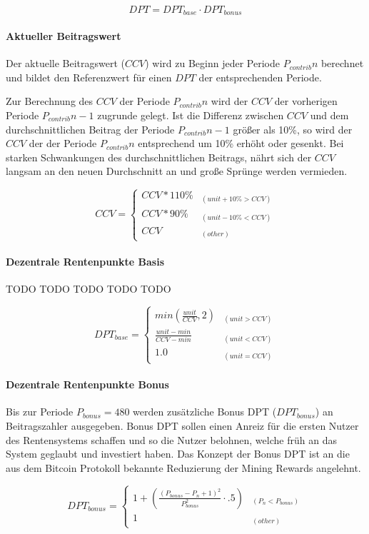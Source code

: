 \begin{equation}
DPT = DPT_{base} \cdot DPT_{bonus}
\end{equation}

\paragraph*{Aktueller Beitragswert}
Der aktuelle Beitragswert ($CCV$) wird zu Beginn jeder Periode 
$P_{contrib}{n}$ berechnet und bildet den Referenzwert für einen $DPT$ der
entsprechenden Periode.

Zur Berechnung des $CCV$ der Periode $P_{contrib}{n}$ wird der $CCV$ der vorherigen
Periode $P_{contrib}{n-1}$ zugrunde gelegt. Ist die Differenz zwischen $CCV$ und dem
durchschnittlichen Beitrag der Periode $P_{contrib}{n-1}$ größer als 10\%, so wird
der $CCV$ der der Periode $P_{contrib}{n}$ entsprechend um 10\% erhöht oder gesenkt.
Bei starken Schwankungen des durchschnittlichen Beitrags, nährt sich der $CCV$ langsam an den neuen Durchschnitt an und große Sprünge werden vermieden.

\begin{equation}
CCV = \begin{cases} 
CCV * 110\% & _{(unit+10\% > CCV)} \\
CCV * 90\% & _{(unit-10\% < CCV)} \\
CCV & _{(other)}
\end{cases}
\end{equation}

\paragraph*{Dezentrale Rentenpunkte Basis}
TODO TODO TODO TODO TODO

\begin{equation}
DPT_{base} = \begin{cases} 
min(\frac{unit} {CCV}, 2) 
  & _{(unit > CCV)} \\
\frac{unit - min} {CCV - min} 
  & _{(unit < CCV)} \\
1.0 & _{(unit = CCV)}
\end{cases}
\end{equation}

\paragraph*{Dezentrale Rentenpunkte Bonus}
Bis zur Periode $P_{bonus} = 480$ werden zusätzliche Bonus DPT 
($DPT_{bonus}$) an
Beitragszahler ausgegeben. Bonus DPT sollen einen Anreiz für
die ersten Nutzer des Rentensystems schaffen und so die Nutzer belohnen, 
welche früh an das System geglaubt und investiert haben. Das Konzept der Bonus DPT
ist an die aus dem Bitcoin Protokoll bekannte Reduzierung der Mining Rewards angelehnt.

\begin{equation}
DPT_{bonus} = \begin{cases} 
1 + (\frac{(P_{bonus} - P_{n} + 1)^2}
      {P_{bonus}^2} \cdot .5) & _{(P_{n} < P_{bonus})} \\
1 & _{(other)} 
\end{cases}
\end{equation}


